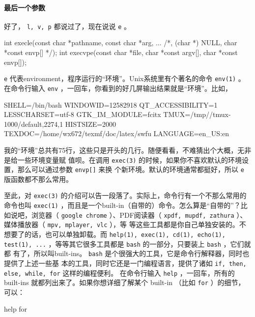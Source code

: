 \documentclass{wx672ctexart}
\begin{document}
\paragraph{最后一个参数}
\label{sec:orgc785db0}

好了， \texttt{l, v, p} 都说过了，现在说说 \texttt{e} 。

\begin{ccode}
int execle(const char *pathname, const char *arg, ...
				/*, (char *) NULL, char *const envp[] */);
int execvpe(const char *file, char *const argv[],
				char *const envp[]);
\end{ccode}

\texttt{e} 代表environment，程序运行的“环境”。Unix系统里有个著名的命令 \texttt{env(1)} 。在命令行输入
\texttt{env} ，一回车，你看到的好几屏输出结果就是“环境”。比如，

\begin{shellcode}
SHELL=/bin/bash
WINDOWID=12582918
QT_ACCESSIBILITY=1
LESSCHARSET=utf-8
GTK_IM_MODULE=fcitx
TMUX=/tmp//tmux-1000/default,2274,1
HISTSIZE=2000
TEXDOC=/home/wx672/texmf/doc/latex/swfu
LANGUAGE=en_US:en
\end{shellcode}
我的“环境”总共有75行，这些只是开头的几行。随便看看，不难猜出个大概，无非是给一些环境变量赋
值呗。在调用 \texttt{exec(3)} 的时候，如果你不喜欢默认的环境设置，那么可以通过参数 \texttt{envp[]} 来换
个新环境。默认的环境通常都挺好，所以 \texttt{e} 版函数都不那么常用。

至此，对 \texttt{exec(3)} 的介绍可以告一段落了。实际上，命令行有一个不那么常用的命令也叫
\texttt{exec(1)} ，而且是一个built-in（自带的）命令。怎么算是“自带的”？比如说吧，浏览器（ \texttt{google
chrome} ）、PDF阅读器（ \texttt{xpdf, mupdf, zathura} ）、媒体播放器（ \texttt{mpv, mplayer, vlc} ），等
等这些工具都是你自己单独安装的。不想要了的话，也可以单独卸载。而 \texttt{help(1), exec(1), cd(1),
echo(1), test(1), ...} ，等等其它很多工具都是 \texttt{bash} 的一部分，只要装上 \texttt{bash} ，它们就都
有了，所以叫built-ins。 \texttt{bash} 是个很强大的工具，它是命令行解释器，同时也提供了上述一些基
本的工具，同时它还是一门编程语言，提供了诸如 \texttt{if, then, else, while, for} 这样的编程便利。
在命令行输入 \texttt{help} ，一回车，所有的 built-ins 就都列出来了。如果你想详细了解某个 built-in
（比如 \texttt{for} ）的细节，可以：
\begin{shellcode}
help for
\end{shellcode}
\end{document}
